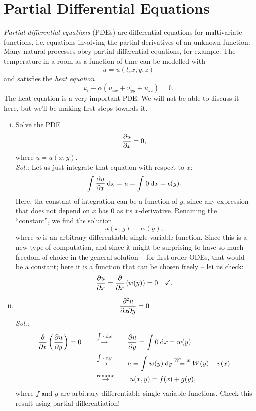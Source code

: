 \section{Partial Differential Equations}
\label{sec:pdes}

\begin{remark}
\emph{Partial differential equations} (PDEs) are differential equations for multivariate functions, i.e. equations involving the partial derivatives of an unknown function. Many natural processes obey partial differential equations, for example: The temperature in a room as a function of time can be modelled with 
\[ u = u(t,x,y,z) \]
and satisfies the \emph{heat equation}
\[ u_t-\alpha\left( u_{xx}+u_{yy}+u_{zz}\right) = 0.\]
The heat equation is a very important PDE. We will not be able to discuss it here, but we'll be making first steps towards it.
\end{remark}

\begin{example}
\begin{enumerate}[(i)]
	\item Solve the PDE \[ \displaystyle{\frac{\partial u}{\partial x}} = 0, \] where $u=u(x,y)$.\\
	{\it Sol.:}
	Let us just integrate that equation with respect to $x$:
	\[ \int_{}^{} \displaystyle{\frac{\partial u}{\partial x}} \: \mathrm{d} x = u = \int_{}^{} 0 \: \mathrm{d} x = c(y). \]
	Here, the constant of integration can be a function of $y$, since any expression that does not depend on $x$ has $0$ as its $x$-derivative. Renaming the ``constant'', we find the solution
	\[ u(x,y) = w(y), \]
	where $w$ is an arbitrary differentiable single-variable function. Since this is a new type of computation, and since it might be surprising to have so much freedom of choice in the general solution -- for first-order ODEs, that would be a constant; here it is a function that can be chosen freely -- let us check: 
	\[ \displaystyle{\frac{\partial u}{\partial x}} = \displaystyle{\frac{\partial }{\partial x}} \left( w(y) \right) = 0 \quad \text{\checkmark}. \]
	\item \[ \displaystyle{\frac{\partial^2 u}{\partial{x}\partial{y}}} = 0 \]
	{\it Sol.:}
	\begin{equation*}
	\begin{split}
	\displaystyle{\frac{\partial }{\partial x}}\left(\displaystyle{\frac{\partial u}{\partial y}}\right) = 0 \qquad & \stackrel{\int_{}^{} \cdot \: \mathrm{d} x}{\rightarrow} \qquad 
	\displaystyle{\frac{\partial u}{\partial y}} = \int_{}^{} 0 \: \mathrm{d} x = w(y) \\
	& \stackrel{\int_{}^{} \cdot \: \mathrm{d} y}{\rightarrow} \qquad u = \int_{}^{} w(y) \: \mathrm{d} y 
	\stackrel{W'=w}{=} W(y) + v(x) \\
	& \stackrel{\text{rename}}{\rightarrow} \qquad u(x,y) = f(x) + g(y),
	\end{split}
	\end{equation*}
	where $f$ and $g$ are arbitrary differentiable single-variable functions. Check this result using partial differentiation!
\end{enumerate}
\end{example}

